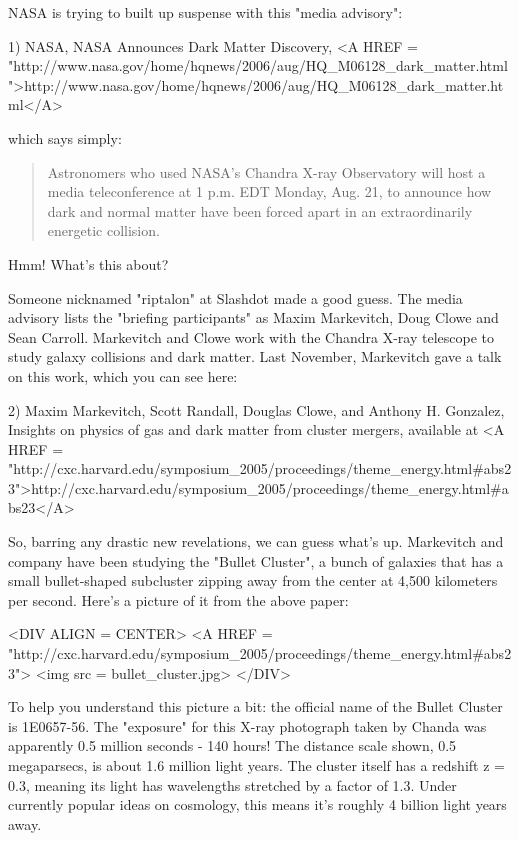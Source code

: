 



NASA is trying to built up suspense with this "media advisory":

1) NASA, NASA Announces Dark Matter Discovery, 
<A HREF = "http://www.nasa.gov/home/hqnews/2006/aug/HQ_M06128_dark_matter.html">http://www.nasa.gov/home/hqnews/2006/aug/HQ_M06128_dark_matter.html</A>

which says simply:

\begin{quote}
 Astronomers who used NASA's Chandra X-ray Observatory will host 
 a media teleconference at 1 p.m. EDT Monday, Aug. 21, to announce 
 how dark and normal matter have been forced apart in an extraordinarily 
 energetic collision.
\end{quote}
    
Hmm!  What's this about?

Someone nicknamed "riptalon" at Slashdot made a good guess.
The media advisory 
lists the "briefing participants" as Maxim Markevitch, Doug
Clowe and Sean Carroll.   Markevitch and Clowe work with the Chandra
X-ray telescope to study galaxy collisions and dark matter.  Last 
November, Markevitch gave a talk on this work, which you can see here:

2) Maxim Markevitch, Scott Randall, Douglas Clowe, and Anthony H. Gonzalez,
Insights on physics of gas and dark matter from cluster mergers, available at 
<A HREF = "http://cxc.harvard.edu/symposium_2005/proceedings/theme_energy.html#abs23">http://cxc.harvard.edu/symposium_2005/proceedings/theme_energy.html#abs23</A>

So, barring any drastic new revelations, we can guess what's up.
Markevitch and company have been studying the "Bullet Cluster", a 
bunch of galaxies that has a small bullet-shaped subcluster zipping 
away from the center at 4,500 kilometers per second.  Here's a picture
of it from the above paper:

<DIV ALIGN = CENTER>
<A HREF = "http://cxc.harvard.edu/symposium_2005/proceedings/theme_energy.html#abs23">
<img src = bullet_cluster.jpg>
</DIV>


To help you understand this picture a bit: the official
name of the Bullet Cluster is 1E0657-56.  The "exposure"
for this X-ray photograph taken by Chanda
was apparently 0.5 million seconds - 140 hours!
The distance scale shown, 0.5 megaparsecs, is about 1.6 million light years.
The cluster itself has a redshift z = 0.3, meaning its light
has wavelengths stretched by a factor of 1.3.  Under currently 
popular ideas on cosmology, this means it's
roughly 4 billion light years away.

